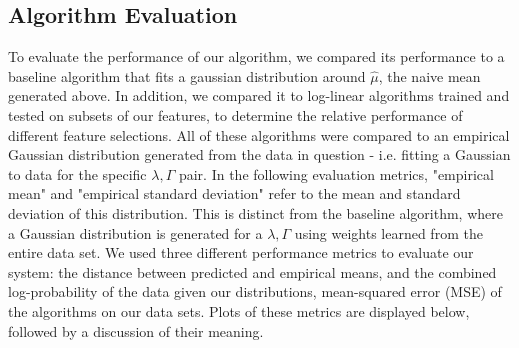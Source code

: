 \documentclass[12pt,letterpaper]{article}
\begin{document}
\subsection{Algorithm Evaluation}

To evaluate the performance of our algorithm, we compared its performance to a baseline algorithm that fits a gaussian distribution around $\hat{\mu}$, the naive mean generated above. In addition, we compared it to log-linear algorithms trained and tested on subsets of our features, to determine the relative performance of different feature selections. All of these algorithms were compared to an empirical Gaussian distribution generated from the data in question - i.e. fitting a Gaussian to data for the specific $\lambda, \Gamma$ pair. In the following evaluation metrics, "empirical mean" and "empirical standard deviation" refer to the mean and standard deviation of this distribution. This is distinct from the baseline algorithm, where a Gaussian distribution is generated for a $\lambda, \Gamma$ using weights learned from the entire data set. We used three different performance metrics to evaluate our system: the distance between predicted and empirical means, and the combined log-probability of the data given our distributions, mean-squared error (MSE) of the algorithms on our data sets. Plots of these metrics are displayed below, followed by a discussion of their meaning. 
\end{document}
